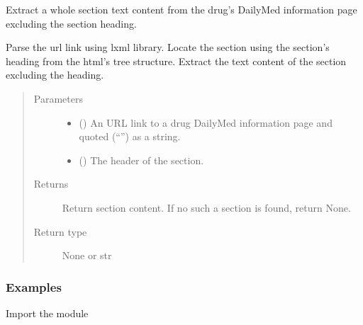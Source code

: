 \documentclass[letterpaper,10pt,english]{sphinxmanual}
\begin{document}

\begin{fulllineitems}
\label{\detokenize{biomarker_extraction:biomarker_extraction.section_content}}
\sphinxAtStartPar
Extract a whole section text content from the drug’s DailyMed information page excluding the section heading.

\sphinxAtStartPar
Parse the url link using lxml library. Locate the section using the section’s heading from the html’s tree structure. Extract the text content of the section excluding the heading.
\begin{quote}\begin{description}
\item[{Parameters}] \leavevmode\begin{itemize}
\item {} 
\sphinxAtStartPar
{} () \textendash{} An URL link to a drug DailyMed information page
and quoted (“”) as a string.

\item {} 
\sphinxAtStartPar
{} () \textendash{} The header of the section.

\end{itemize}

\item[{Returns}] \leavevmode
\sphinxAtStartPar
Return section content. If no such a section is found, return None.

\item[{Return type}] \leavevmode
\sphinxAtStartPar
None or str

\end{description}\end{quote}
\subsubsection*{Examples}

\sphinxAtStartPar
Import the module

\begin{sphinxVerbatim}[commandchars=\\\{\}]
   
\end{sphinxVerbatim}


\end{fulllineitems}
\end{document}
